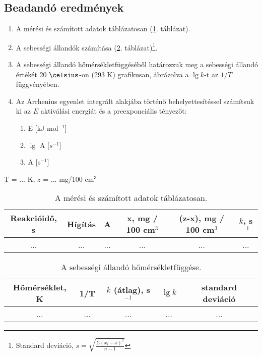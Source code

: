 \subsection{Beadandó eredmények}

\begin{enumerate}
\item A mérési és számított adatok táblázatosan (\ref{table:tablazatos}. táblázat).
\item A sebességi állandók számítása (\ref{table:seb}. táblázat)\footnote{Standard deviáció, $s=\sqrt{\frac{\Sigma(x_i-\overline{x})^2}{n-1}}$}.
\item A sebességi állandó hőmérsékletfüggéséből határozzuk meg a sebességi állandó értékét 20 $\celsius$-on (293 K) grafikusan, ábrázolva a $\lg k$-t az $1/T$ függvényében.
\item Az Arrhenius egyenlet integrált alakjába történő behelyettesítéssel számítsuk ki az $E$ aktiválási energiát és a preexponciális tényezőt:
	\begin{enumerate}
		\item E [kJ mol$^{-1}$]
		\item $\lg$ A [$s^{-1}$]
		\item A [s$^{-1}$]
	\end{enumerate}
\end{enumerate}

\begin{table}[!h]
\caption{A mérési és számított adatok táblázatosan.}
\centering
T = ... K, $z$ = ... mg/100 cm$^3$
\begin{tabular}{|c|c|c|c|c|c|}
\hline
Reakcióidő, s&Hígítás&A&x, mg / 100 cm$^3$ &(z-x), mg / 100 cm$^3$ & $k$, s$^{-1}$ \\
\hline
... & ... & ... & ... & ... & ... \\
\end{tabular}
\label{table:tablazatos}
\end{table}

\begin{table}[!h]
\caption{A sebességi állandó hőmérsékletfüggése.}
\centering
\begin{tabular}{|c|c|c|c|c|}
\hline
Hőmérséklet, K& 1/T & $\overline{k}$ (átlag), s$^{-1}$ & $\lg k$ & standard deviáció \\
\hline
... & ... & ... & ... & ... \\
\end{tabular}
\label{table:seb}
\end{table}
